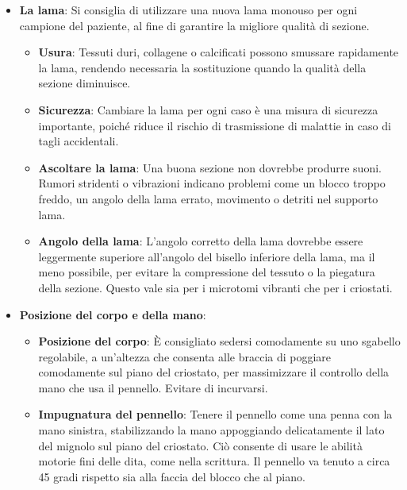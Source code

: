 \begin{itemize}
\item \textbf{La lama}: Si consiglia di utilizzare una nuova lama monouso per ogni campione del paziente, al fine di garantire la migliore qualità di sezione.
\begin{itemize}
    \item \textbf{Usura}: Tessuti duri, collagene o calcificati possono smussare rapidamente la lama, rendendo necessaria la sostituzione quando la qualità della sezione diminuisce.
    \item \textbf{Sicurezza}: Cambiare la lama per ogni caso è una misura di sicurezza importante, poiché riduce il rischio di trasmissione di malattie in caso di tagli accidentali.
    \item \textbf{Ascoltare la lama}: Una buona sezione non dovrebbe produrre suoni. Rumori stridenti o vibrazioni indicano problemi come un blocco troppo freddo, un angolo della lama errato, movimento o detriti nel supporto lama.
    \item \textbf{Angolo della lama}: L'angolo corretto della lama dovrebbe essere leggermente superiore all'angolo del bisello inferiore della lama, ma il meno possibile, per evitare la compressione del tessuto o la piegatura della sezione. Questo vale sia per i microtomi vibranti che per i criostati.
\end{itemize}

\item \textbf{Posizione del corpo e della mano}:
\begin{itemize}
    \item \textbf{Posizione del corpo}: È consigliato sedersi comodamente su uno sgabello regolabile, a un'altezza che consenta alle braccia di poggiare comodamente sul piano del criostato, per massimizzare il controllo della mano che usa il pennello. Evitare di incurvarsi. 
    \item \textbf{Impugnatura del pennello}: Tenere il pennello come una penna con la mano sinistra, stabilizzando la mano appoggiando delicatamente il lato del mignolo sul piano del criostato. Ciò consente di usare le abilità motorie fini delle dita, come nella scrittura. Il pennello va tenuto a circa 45 gradi rispetto sia alla faccia del blocco che al piano. 
\end{itemize}


\end{itemize}


